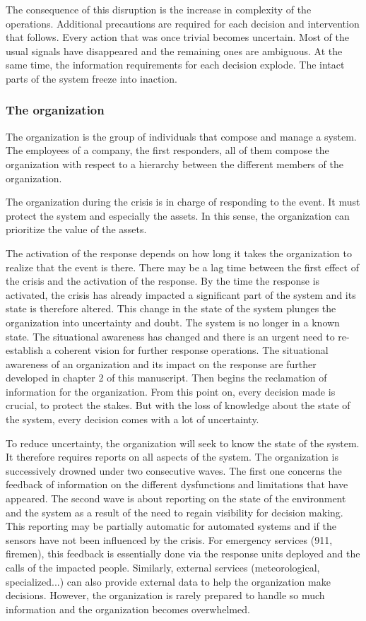 The consequence of this disruption is the increase in complexity of the operations.
Additional precautions are required for each decision and intervention that follows.
Every action that was once trivial becomes uncertain.
Most of the usual signals have disappeared and the remaining ones are ambiguous.
At the same time, the information requirements for each decision explode.
The intact parts of the system freeze into inaction.

\subsubsection{The organization}
The organization is the group of individuals that compose and manage a system.
The employees of a company, the first responders, all of them compose the organization with respect to a hierarchy between the different members of the organization.

The organization during the crisis is in charge of responding to the event.
It must protect the system and especially the assets.
In this sense, the organization can prioritize the value of the assets.

The activation of the response depends on how long it takes the organization to realize that the event is there.
There may be a lag time between the first effect of the crisis and the activation of the response.
By the time the response is activated, the crisis has already impacted a significant part of the system and its state is therefore altered.
This change in the state of the system plunges the organization into uncertainty and doubt.
The system is no longer in a known state.
The situational awareness has changed and there is an urgent need to re-establish a coherent vision for further response operations.
The situational awareness of an organization and its impact on the response are further developed in chapter 2 of this manuscript.
Then begins the reclamation of information for the organization.
From this point on, every decision made is crucial, to protect the stakes.
But with the loss of knowledge about the state of the system, every decision comes with a lot of uncertainty.

To reduce uncertainty, the organization will seek to know the state of the system.
It therefore requires reports on all aspects of the system.
The organization is successively drowned under two consecutive waves.
The first one concerns the feedback of information on the different dysfunctions and limitations that have appeared.
The second wave is about reporting on the state of the environment and the system as a result of the need to regain visibility for decision making.
This reporting may be partially automatic for automated systems and if the sensors have not been influenced by the crisis.
For emergency services (911, firemen), this feedback is essentially done via the response units deployed and the calls of the impacted people.
Similarly, external services (meteorological, specialized...) can also provide external data to help the organization make decisions.
However, the organization is rarely prepared to handle so much information and the organization becomes overwhelmed.

